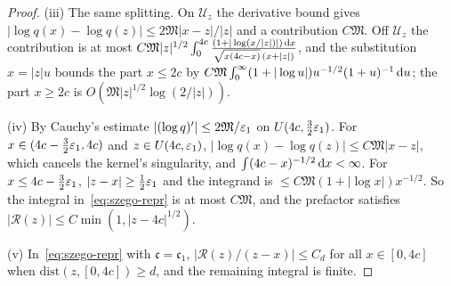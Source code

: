 \begin{proof}
(iii) The same splitting. On $\mathcal U_z$ the derivative bound gives $|\log q(x)-\log q(z)|\le2\mathfrak M|x-z|/|z|$ and a
contribution $C\mathfrak M$. Off $\mathcal U_z$ the contribution is at most
$C\mathfrak M|z|^{1/2}\int_0^{4c}\frac{(1+|\log(x/|z|)|)\,\mathrm{d} x}{\sqrt{x(4c-x)}\,(x+|z|)}$, and the substitution $x=|z|u$ bounds the
part $x\le2c$ by $C\mathfrak M\int_0^\infty(1+|\log u|)u^{-1/2}(1+u)^{-1}\,\mathrm{d} u$; the part $x\ge2c$ is $O(\mathfrak M|z|^{1/2}\log(2/|z|))$.

(iv) By Cauchy's estimate $|(\log q)'|\le 2\mathfrak M/\varepsilon_1$ on $U(4c,\frac32\varepsilon_1)$. For $x\in(4c-\frac32\varepsilon_1,4c)$ and
$z\in U(4c,\varepsilon_1)$, $|\log q(x)-\log q(z)|\le C\mathfrak M|x-z|$, which cancels the kernel's singularity, and
$\int(4c-x)^{-1/2}\,\mathrm{d} x<\infty$. For $x\le4c-\frac32\varepsilon_1$, $|z-x|\ge\frac12\varepsilon_1$ and the integrand is
$\le C\mathfrak M(1+|\log x|)x^{-1/2}$. So the integral in~\eqref{eq:szego-repr} is at most $C\mathfrak M$, and the prefactor satisfies
$|\mathcal R(z)|\le C\min(1,|z-4c|^{1/2})$.

(v) In~\eqref{eq:szego-repr} with $\mathfrak c=\mathfrak c_1$, $|\mathcal R(z)/(z-x)|\le C_d$ for all $x\in[0,4c]$ when
$\mathrm{dist}(z,[0,4c])\ge d$, and the remaining integral is finite.


\end{proof}
